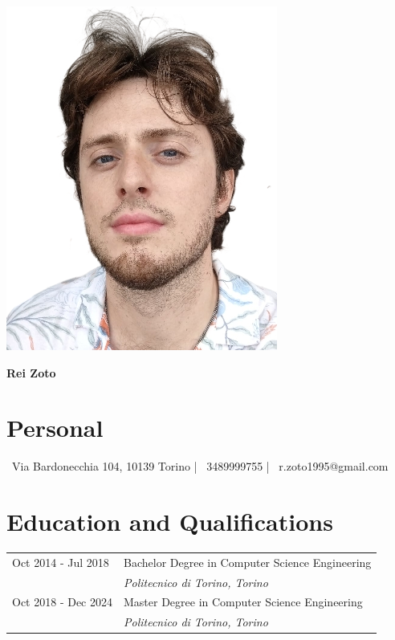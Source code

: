 \documentclass[10.5pt,a4paper]{article}
\begin{document}
\begin{minipage}{0.2\textwidth}
    \includegraphics[width=\linewidth]{propic-crop.png}
\end{minipage}
\hspace{2cm}
\begin{minipage}{0.59\textwidth}
    {\huge\bfseries Rei Zoto}
\end{minipage}

\section*{Personal}
\faMapMarker\ Via Bardonecchia 104, 10139 Torino \hspace{1em} | \hspace{1em}
\faMobile\ 3489999755 \hspace{1em} | \hspace{1em}
\faEnvelope\ r.zoto1995@gmail.com


\section*{Education and Qualifications}
\begin{tabular}{ll}
  Oct 2014 - Jul 2018 & Bachelor Degree in Computer Science Engineering \\
                      & \textit{Politecnico di Torino, Torino} \\[1ex]
  Oct 2018 - Dec 2024 & Master Degree in Computer Science Engineering \\
                      & \textit{Politecnico di Torino, Torino}
  \end{tabular}
  
\end{document}
